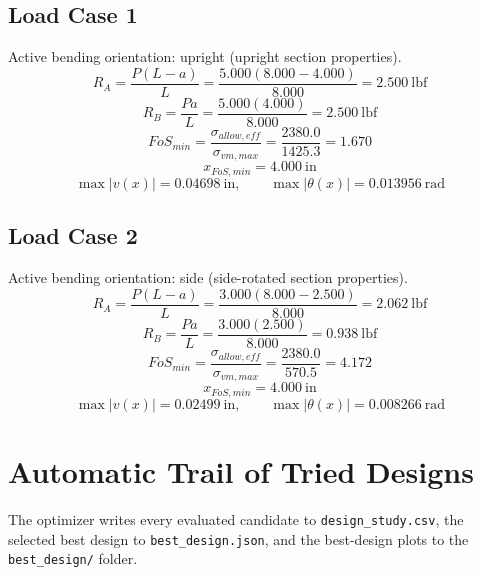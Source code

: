 \documentclass[11pt]{article}
\begin{document}
\subsection*{Load Case 1}
Active bending orientation: upright (upright section properties).
\[R_A = \frac{P(L-a)}{L} = \frac{5.000(8.000-4.000)}{8.000} = 2.500\ \mathrm{lbf}\]
\[R_B = \frac{Pa}{L} = \frac{5.000(4.000)}{8.000} = 2.500\ \mathrm{lbf}\]
\[FoS_{min} = \frac{\sigma_{allow,eff}}{\sigma_{vm,max}} = \frac{2380.0}{1425.3} = 1.670\]
\[x_{FoS,min} = 4.000\ \mathrm{in}\]
\[\max |v(x)| = 0.04698\ \mathrm{in}, \qquad \max |\theta(x)| = 0.013956\ \mathrm{rad}\]
\subsection*{Load Case 2}
Active bending orientation: side (side-rotated section properties).
\[R_A = \frac{P(L-a)}{L} = \frac{3.000(8.000-2.500)}{8.000} = 2.062\ \mathrm{lbf}\]
\[R_B = \frac{Pa}{L} = \frac{3.000(2.500)}{8.000} = 0.938\ \mathrm{lbf}\]
\[FoS_{min} = \frac{\sigma_{allow,eff}}{\sigma_{vm,max}} = \frac{2380.0}{570.5} = 4.172\]
\[x_{FoS,min} = 4.000\ \mathrm{in}\]
\[\max |v(x)| = 0.02499\ \mathrm{in}, \qquad \max |\theta(x)| = 0.008266\ \mathrm{rad}\]

\section*{Automatic Trail of Tried Designs}
The optimizer writes every evaluated candidate to \texttt{design\_study.csv}, the selected best design to \texttt{best\_design.json}, and the best-design plots to the \texttt{best\_design/} folder.
\end{document}
